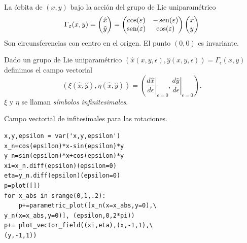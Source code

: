 \begin{ejemplo} La órbita de $(x,y)$ bajo la acción del grupo  de Lie uniparamétrico
\[
\Gamma_{\varepsilon}(x,y)= \begin{pmatrix} \hat{x}\\ \hat{y}
\end{pmatrix}=\begin{pmatrix} \cos(\varepsilon) & -\operatorname{sen}(\varepsilon)
\\ \operatorname{sen}(\varepsilon) & \cos(\varepsilon)
\end{pmatrix} \begin{pmatrix} x\\ y
\end{pmatrix}
\]
Son circunsferencias con centro en el origen. El punto $(0,0)$ es invariante.

\end{ejemplo}


\begin{definicion}
 Dado un grupo de Lie uniparamétrico $(\hat{x}(x,y,\epsilon),\hat{y}(x,y,\epsilon))=\Gamma_{\epsilon}(x,y)$  definimos el campo vectorial
\[(\xi(\hat{x},\hat{y}),\eta(\hat{x}, \hat{y}))=\left(\left.\frac{d\hat{x}}{d\epsilon}\right|_{\epsilon=0}, \left.\frac{d\hat{y}}{d\epsilon}\right|_{\epsilon=0}   \right).\]
 $\xi$ y $\eta$ se llaman \emph{símbolos infinitesimales}.
\end{definicion}





\begin{ejemplo}
Campo vectorial de infitesimales para las rotaciones. 
\end{ejemplo}




\begin{lstlisting}
x,y,epsilon = var('x,y,epsilon')
x_n=cos(epsilon)*x-sin(epsilon)*y
y_n=sin(epsilon)*x+cos(epsilon)*y
xi=x_n.diff(epsilon)(epsilon=0)
eta=y_n.diff(epsilon)(epsilon=0)
p=plot([])
for x_abs in srange(0,1,.2):
    p+=parametric_plot([x_n(x=x_abs,y=0),\
y_n(x=x_abs,y=0)], (epsilon,0,2*pi))
p+= plot_vector_field((xi,eta),(x,-1,1),\
(y,-1,1))
\end{lstlisting}


